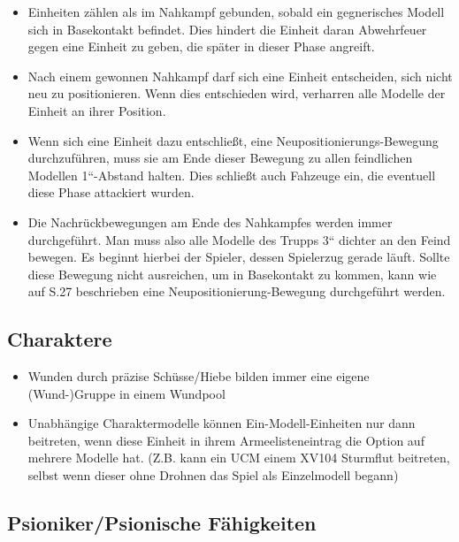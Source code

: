 \begin{itemize}
\item Einheiten zählen als im Nahkampf gebunden, sobald ein gegnerisches Modell
 sich in Basekontakt befindet. Dies hindert die Einheit daran Abwehrfeuer gegen
 eine Einheit zu geben, die später in dieser Phase angreift.

\item Nach einem gewonnen Nahkampf darf sich eine Einheit entscheiden, sich
 nicht neu zu positionieren. Wenn dies entschieden wird, verharren alle Modelle
 der Einheit an ihrer Position.

\item Wenn sich eine Einheit dazu entschließt, eine Neupositionierungs-Bewegung
 durchzuführen, muss sie am Ende dieser Bewegung zu allen feindlichen Modellen
 1“-Abstand halten. Dies schließt auch Fahzeuge ein, die eventuell diese Phase
 attackiert wurden.

\item Die Nachrückbewegungen am Ende des Nahkampfes werden immer durchgeführt.
 Man muss also alle Modelle des Trupps 3“ dichter an den Feind bewegen. Es
 beginnt hierbei der Spieler, dessen Spielerzug gerade läuft.  Sollte diese
 Bewegung nicht ausreichen, um in Basekontakt zu kommen, kann wie auf S.27
 beschrieben eine Neupositionierung-Bewegung durchgeführt werden.

\end{itemize}

\subsection{Charaktere}

\begin{itemize}

 \item Wunden durch präzise Schüsse/Hiebe bilden immer eine eigene (Wund-)Gruppe
  in einem Wundpool

 \item Unabhängige Charaktermodelle können Ein-Modell-Einheiten nur dann
  beitreten, wenn diese Einheit in ihrem Armeelisteneintrag die Option auf
  mehrere Modelle hat. (Z.B. kann ein UCM einem XV104 Sturmflut beitreten,
  selbst wenn dieser ohne Drohnen das Spiel als Einzelmodell begann)

\end{itemize}

\subsection{Psioniker/Psionische Fähigkeiten}

